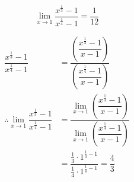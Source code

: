 \documentclass[14pt,fleqn]{extarticle}
\begin{document}
 

\begin{snippet}
    
    \incorrect

\[ \lim_{x\to 1}\dfrac{x^{\frac{1}{3}}-1}{x^{\frac{1}{4}}- 1} = \dfrac{1}{12} \]    
    \reason

\begin{align}
\dfrac{x^{\frac{1}{3}}-1}{x^{\frac{1}{4}}- 1} &= 
\dfrac{\left(\dfrac{x^{\frac{1}{3}}-1}{x-1}\right)}{\left(\dfrac{x^{\frac{1}{4}}- 1}{x-1}\right)} \\
\therefore \lim_{x\to 1}\dfrac{x^{\frac{1}{3}}-1}{x^{\frac{1}{4}}- 1} &= 
\dfrac{\lim_{x\to 1}\left(\dfrac{x^{\frac{1}{3}}-1}{x-1}\right)}{\lim_{x\to 1}\left(\dfrac{x^{\frac{1}{4}}- 1}{x-1}\right)} \\
&= \dfrac{\frac{1}{3}\cdot 1^{\frac{1}{3}-1}}{\frac{1}{4}\cdot 1^{\frac{1}{4}-1}} = \dfrac{4}{3}
\end{align}
    
\end{snippet} 
\end{document}
